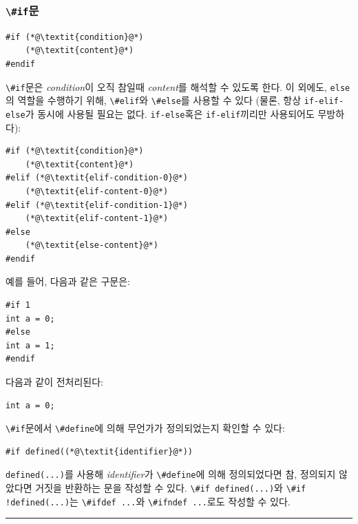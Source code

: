 \documentclass[a4paper,12pt]{book}
\newcommand{\V}[1]{\Verb|#1|}
\begin{document}
        \subsubsection{\V{\#if}문}

            \begin{lstlisting}
#if (*@\textit{condition}@*)
    (*@\textit{content}@*)
#endif
            \end{lstlisting}

            \V{\#if}문은 \textit{condition}이 오직 참일때 \textit{content}를 해석할 수 있도록 한다.
            이 외에도, \V{else}의 역할을 수행하기 위해, \V{\#elif}와 \V{\#else}를 사용할 수 있다
            (물론, 항상 \V{if-elif-else}가 동시에 사용될 필요는 없다.
            \V{if-else}혹은 \V{if-elif}끼리만 사용되어도 무방하다):

            \begin{lstlisting}
#if (*@\textit{condition}@*)
    (*@\textit{content}@*)
#elif (*@\textit{elif-condition-0}@*)
    (*@\textit{elif-content-0}@*)
#elif (*@\textit{elif-condition-1}@*)
    (*@\textit{elif-content-1}@*)
#else
    (*@\textit{else-content}@*)
#endif
            \end{lstlisting}

            예를 들어, 다음과 같은 구문은:

            \begin{lstlisting}
#if 1
int a = 0;
#else
int a = 1;
#endif
            \end{lstlisting}

            다음과 같이 전처리된다:

            \begin{lstlisting}
int a = 0;
            \end{lstlisting}

            \V{\#if}문에서 \V{\#define}에 의해 무언가가 정의되었는지 확인할 수 있다:

            \begin{lstlisting}
#if defined((*@\textit{identifier}@*))
            \end{lstlisting}

            \V{defined(...)}를 사용해 \textit{identifier}가 \V{\#define}에 의해 정의되었다면
            참, 정의되지 않았다면 거짓을 반환하는 문을 작성할 수 있다.
            \V{\#if defined(...)}와 \V{\#if !defined(...)}는
            \V{\#ifdef ...}와 \V{\#ifndef ...}로도 작성할 수 있다.

        \noindent\textcolor[RGB]{220,220,220}{
            \rule{\textwidth}{0.4pt}
        }
\end{document}
